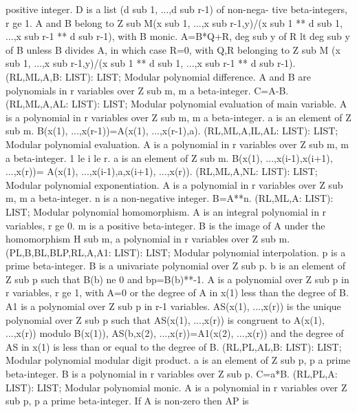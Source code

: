 positive integer.  D is a list (d sub 1, ...,d sub r-1) of non-nega-
tive beta-integers, r ge 1.  A and B belong to Z sub M(x sub 1, ...,x
sub r-1,y)/(x sub 1 ** d sub 1, ...,x sub r-1 ** d sub r-1), with B
monic.  A=B*Q+R, deg sub y of R lt deg sub y of B unless B divides A,
in which case R=0, with Q,R belonging to Z sub M (x sub 1, ...,x sub
r-1,y)/(x sub 1 ** d sub 1, ...,x sub r-1 ** d sub r-1). \ecom 
{} (RL,ML,A,B: LIST): LIST; \eproc
\bcom Modular polynomial difference. A and B are polynomials in r
variables over Z sub m, m a beta-integer. C=A-B. \ecom 
{} (RL,ML,A,AL: LIST): LIST; \eproc
\bcom Modular polynomial evaluation of main variable. A is a polynomial in
r variables over Z sub m, m a beta-integer.  a is an element of
Z sub m. B(x(1), ...,x(r-1))=A(x(1), ...,x(r-1),a). \ecom 
{} (RL,ML,A,IL,AL: LIST): LIST; \eproc
\bcom Modular polynomial evaluation. A is a polynomial in r variables
over Z sub m, m a beta-integer.  1 le i le r.  a is an element of
Z sub m.  B(x(1), ...,x(i-1),x(i+1), ...,x(r))=
A(x(1), ...,x(i-1),a,x(i+1), ...,x(r)). \ecom 
{} (RL,ML,A,NL: LIST): LIST; \eproc
\bcom Modular polynomial exponentiation. A is a polynomial in r variables
over Z sub m, m a beta-integer.  n is a non-negative integer.
B=A**n. \ecom 
{} (RL,ML,A: LIST): LIST; \eproc
\bcom Modular polynomial homomorphism. A is an integral polynomial in r
variables, r ge 0.  m is a positive beta-integer.  B is the image of
A under the homomorphism H sub m, a polynomial in r variables over
Z sub m. \ecom 
{} (PL,B,BL,BLP,RL,A,A1: LIST): LIST; \eproc
\bcom Modular polynomial interpolation. p is a prime beta-integer. B is
a univariate polynomial over Z sub p.  b is an element of Z sub p
such that B(b) ne 0 and bp=B(b)**-1.  A is a polynomial over Z sub
p in r variables, r ge 1, with A=0 or the degree of A in x(1) less
than the degree of B.  A1 is a polynomial over Z sub p in r-1
variables.  AS(x(1), ...,x(r)) is the unique polynomial over Z sub
p such that AS(x(1), ...,x(r)) is congruent to A(x(1), ...,x(r))
modulo B(x(1)), AS(b,x(2), ...,x(r))=A1(x(2), ...,x(r)) and
the degree of AS in x(1) is less than or equal to the degree of B. \ecom 
{} (RL,PL,AL,B: LIST): LIST; \eproc
\bcom Modular polynomial modular digit product. a is an element of
Z sub p, p a prime beta-integer.  B is a polynomial in r variables
over Z sub p. C=a*B. \ecom 
{} (RL,PL,A: LIST): LIST; \eproc
\bcom Modular polynomial monic. A is a polynomial in r variables over
Z sub p, p a prime beta-integer.  If A is non-zero then AP is
